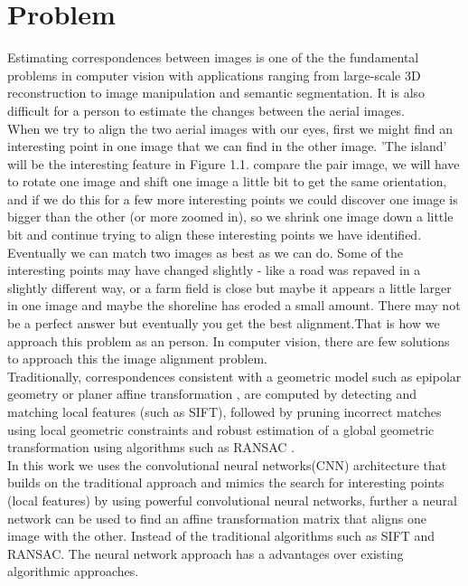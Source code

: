  


\section{Problem}

Estimating correspondences between images is one of the the fundamental problems in computer vision with applications ranging from large-scale 3D reconstruction to image manipulation and semantic segmentation. It is also difficult for a person to estimate the changes between the aerial images.\\       
 When we try to align the two aerial images with our eyes, first we might find an interesting point in one image that we can find in the other image. 'The island' will be the interesting feature in Figure 1.1. compare the pair image, we will have to rotate one image and shift one image a little bit to get the same orientation, and if we do this for a few more interesting points we could discover one image is bigger than the other (or more zoomed in), so we shrink one image down a little bit and continue trying to align these interesting points we have identified. Eventually we can match two images as best as we can do. Some of the interesting points may have changed slightly - like a road was repaved in a slightly different way, or a farm field is close but maybe it appears a little larger in one image and maybe the shoreline has eroded a small amount. There may not be a perfect answer but eventually you get the best alignment.That is how we approach this problem as an person. In computer vision, there are few solutions to approach this the image alignment problem.  \\
  Traditionally, correspondences consistent with a geometric model such as epipolar geometry or planer affine transformation , are computed by detecting and matching local features (such as SIFT), followed by pruning incorrect matches using local geometric constraints and robust estimation of a global geometric transformation using algorithms such as RANSAC \cite{fischler1981random}. \\
In this work we uses the convolutional neural networks(CNN) architecture that builds on the traditional approach and mimics the search for interesting points (local features) by using powerful convolutional neural networks, further a neural network can be used to find an affine transformation matrix that aligns one image with the other. Instead of the traditional algorithms such as SIFT and RANSAC. The neural network approach has a advantages over existing algorithmic approaches.\\
